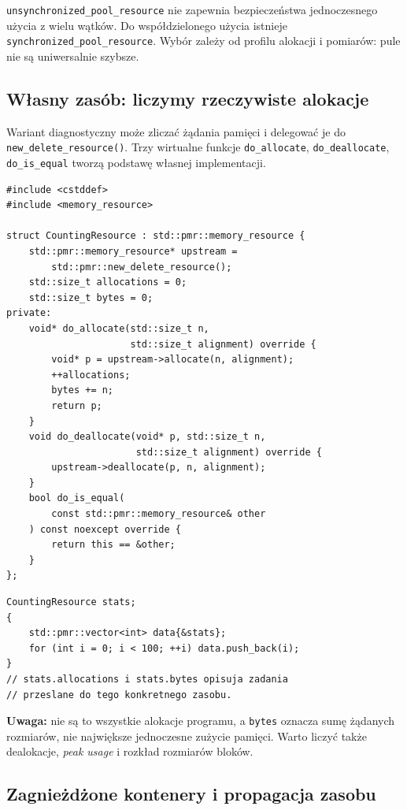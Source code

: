 \texttt{unsynchronized\_pool\_resource} nie zapewnia bezpieczeństwa
jednoczesnego użycia z wielu wątków. Do współdzielonego użycia
istnieje \texttt{synchronized\_pool\_resource}. Wybór zależy od
profilu alokacji i pomiarów: pule nie są uniwersalnie szybsze.

\subsection{Własny zasób: liczymy rzeczywiste alokacje}

Wariant diagnostyczny może zliczać żądania pamięci i delegować je
do \texttt{new\_delete\_resource()}. Trzy wirtualne funkcje
\texttt{do\_allocate}, \texttt{do\_deallocate}, \texttt{do\_is\_equal}
tworzą podstawę własnej implementacji.

\begin{lstlisting}
#include <cstddef>
#include <memory_resource>

struct CountingResource : std::pmr::memory_resource {
    std::pmr::memory_resource* upstream =
        std::pmr::new_delete_resource();
    std::size_t allocations = 0;
    std::size_t bytes = 0;
private:
    void* do_allocate(std::size_t n,
                      std::size_t alignment) override {
        void* p = upstream->allocate(n, alignment);
        ++allocations;
        bytes += n;
        return p;
    }
    void do_deallocate(void* p, std::size_t n,
                       std::size_t alignment) override {
        upstream->deallocate(p, n, alignment);
    }
    bool do_is_equal(
        const std::pmr::memory_resource& other
    ) const noexcept override {
        return this == &other;
    }
};
\end{lstlisting}

\begin{lstlisting}
CountingResource stats;
{
    std::pmr::vector<int> data{&stats};
    for (int i = 0; i < 100; ++i) data.push_back(i);
}
// stats.allocations i stats.bytes opisuja zadania
// przeslane do tego konkretnego zasobu.
\end{lstlisting}

\textbf{Uwaga:} nie są to wszystkie alokacje programu, a
\texttt{bytes} oznacza sumę żądanych rozmiarów, nie największe
jednoczesne zużycie pamięci. Warto liczyć także dealokacje,
\emph{peak usage} i rozkład rozmiarów bloków.

\subsection{Zagnieżdżone kontenery i propagacja zasobu}

